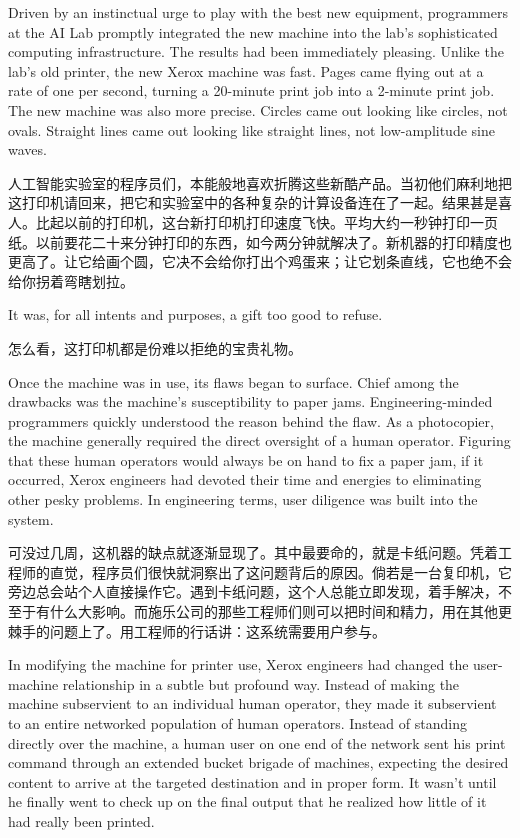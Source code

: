 \ifdefined\eng
Driven by an instinctual urge to play with the best new equipment, programmers at the AI Lab promptly integrated the new machine into the lab's sophisticated computing infrastructure. The results had been immediately pleasing. Unlike the lab's old printer, the new Xerox machine was fast. Pages came flying out at a rate of one per second, turning a 20-minute print job into a 2-minute print job. The new machine was also more precise. Circles came out looking like circles, not ovals. Straight lines came out looking like straight lines, not low-amplitude sine waves.
\fi

\ifdefined\chs
人工智能实验室的程序员们，本能般地喜欢折腾这些新酷产品。当初他们麻利地把这打印机请回来，把它和实验室中的各种复杂的计算设备连在了一起。结果甚是喜人。比起以前的打印机，这台新打印机打印速度飞快。平均大约一秒钟打印一页纸。以前要花二十来分钟打印的东西，如今两分钟就解决了。新机器的打印精度也更高了。让它给画个圆，它决不会给你打出个鸡蛋来；让它划条直线，它也绝不会给你拐着弯瞎划拉。
\fi

\ifdefined\eng
It was, for all intents and purposes, a gift too good to refuse.
\fi

\ifdefined\chs
怎么看，这打印机都是份难以拒绝的宝贵礼物。
\fi

\ifdefined\eng
Once the machine was in use, its flaws began to surface. Chief among the drawbacks was the machine's susceptibility to paper jams. Engineering-minded programmers quickly understood the reason behind the flaw. As a photocopier, the machine generally required the direct oversight of a human operator. Figuring that these human operators would always be on hand to fix a paper jam, if it occurred, Xerox engineers had devoted their time and energies to eliminating other pesky problems. In engineering terms, user diligence was built into the system.
\fi

\ifdefined\chs
可没过几周，这机器的缺点就逐渐显现了。其中最要命的，就是卡纸问题。凭着工程师的直觉，程序员们很快就洞察出了这问题背后的原因。倘若是一台复印机，它旁边总会站个人直接操作它。遇到卡纸问题，这个人总能立即发现，着手解决，不至于有什么大影响。而施乐公司的那些工程师们则可以把时间和精力，用在其他更棘手的问题上了。用工程师的行话讲：这系统需要用户参与。
\fi

\ifdefined\eng
In modifying the machine for printer use, Xerox engineers had changed the user-machine relationship in a subtle but profound way. Instead of making the machine subservient to an individual human operator, they made it subservient to an entire networked population of human operators. Instead of standing directly over the machine, a human user on one end of the network sent his print command through an extended bucket brigade of machines, expecting the desired content to arrive at the targeted destination and in proper form. It wasn't until he finally went to check up on the final output that he realized how little of it had really been printed.
\fi

